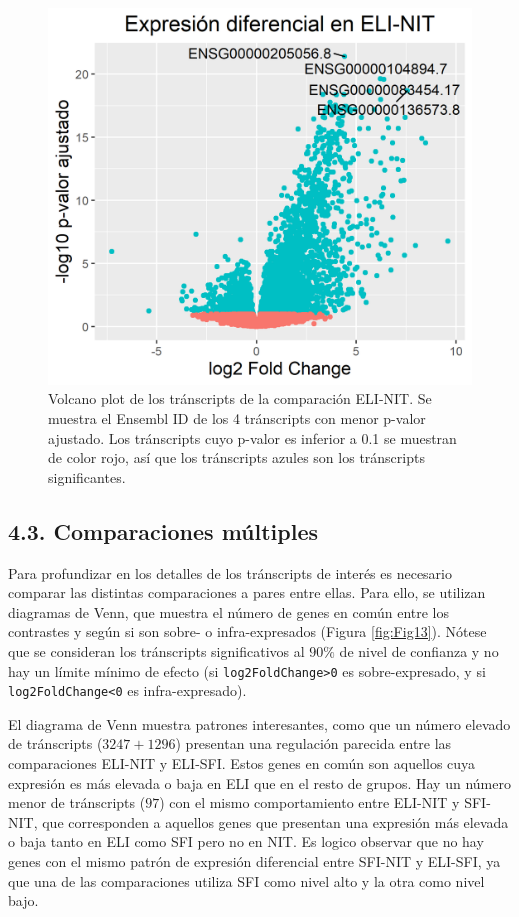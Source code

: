 \documentclass[
]{article}
\begin{document}
\begin{figure}

{\centering \includegraphics[width=0.8\linewidth]{results/4.DEAnl/6.VolcPl} 

}

\caption{Volcano plot de los tránscripts de la comparación ELI-NIT. Se muestra el Ensembl ID de los 4 tránscripts con menor p-valor ajustado. Los tránscripts cuyo p-valor es inferior a 0.1 se muestran de color rojo, así que los tránscripts azules son los tránscripts significantes.}\label{fig:Fig12}
\end{figure}

\hypertarget{comparaciones-muxfaltiples-1}{%
\subsection{4.3. Comparaciones
múltiples}\label{comparaciones-muxfaltiples-1}}

Para profundizar en los detalles de los tránscripts de interés es
necesario comparar las distintas comparaciones a pares entre ellas. Para
ello, se utilizan diagramas de Venn, que muestra el número de genes en
común entre los contrastes y según si son sobre- o infra-expresados
(Figura \ref{fig:Fig13}). Nótese que se consideran los tránscripts
significativos al \(90\%\) de nivel de confianza y no hay un límite
mínimo de efecto (si \texttt{log2FoldChange\textgreater{}0} es
sobre-expresado, y si \texttt{log2FoldChange\textless{}0} es
infra-expresado).

El diagrama de Venn muestra patrones interesantes, como que un número
elevado de tránscripts (\(3247+1296\)) presentan una regulación parecida
entre las comparaciones ELI-NIT y ELI-SFI. Estos genes en común son
aquellos cuya expresión es más elevada o baja en ELI que en el resto de
grupos. Hay un número menor de tránscripts (\(97\)) con el mismo
comportamiento entre ELI-NIT y SFI-NIT, que corresponden a aquellos
genes que presentan una expresión más elevada o baja tanto en ELI como
SFI pero no en NIT. Es logico observar que no hay genes con el mismo
patrón de expresión diferencial entre SFI-NIT y ELI-SFI, ya que una de
las comparaciones utiliza SFI como nivel alto y la otra como nivel bajo.
\end{document}
